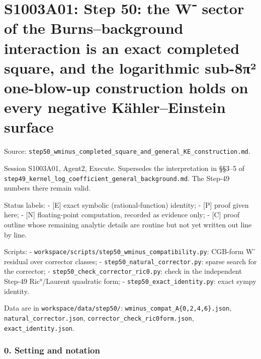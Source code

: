 \documentclass[
  10pt,
]{report}
\begin{document}
\hypertarget{s1003a01-step-50-the-w-sector-of-the-burnsbackground-interaction-is-an-exact-completed-square-and-the-logarithmic-sub-8ux3c0uxb2-one-blow-up-construction-holds-on-every-negative-kuxe4hlereinstein-surface}{%
\chapter{S1003A01: Step 50: the W⁻ sector of the Burns--background
interaction is an exact completed square, and the logarithmic sub-8π²
one-blow-up construction holds on every negative Kähler--Einstein
surface}\label{s1003a01-step-50-the-w-sector-of-the-burnsbackground-interaction-is-an-exact-completed-square-and-the-logarithmic-sub-8ux3c0uxb2-one-blow-up-construction-holds-on-every-negative-kuxe4hlereinstein-surface}}

Source:
\texttt{step50\_wminus\_completed\_square\_and\_general\_KE\_construction.md}.

Session S1003A01, Agent2, Execute. Supersedes the interpretation in
§§3--5 of
\texttt{step49\_kernel\_log\_coefficient\_general\_background.md}. The
Step-49 numbers there remain valid.

Status labels: - {[}E{]} exact symbolic (rational-function) identity; -
{[}P{]} proof given here; - {[}N{]} floating-point computation, recorded
as evidence only; - {[}C{]} proof outline whose remaining analytic
details are routine but not yet written out line by line.

Scripts: - \texttt{workspace/scripts/step50\_wminus\_compatibility.py}:
CGB-form W⁻ residual over corrector classes; -
\texttt{step50\_natural\_corrector.py}: sparse search for the corrector;
- \texttt{step50\_check\_corrector\_ric0.py}: check in the independent
Step-49 Ric°/Laurent quadratic form; -
\texttt{step50\_exact\_identity.py}: exact sympy identity.

Data are in \texttt{workspace/data/step50/}:
\texttt{wminus\_compat\_A\{0,2,4,6\}.json},
\texttt{natural\_corrector.json},
\texttt{corrector\_check\_ric0form.json}, \texttt{exact\_identity.json}.

\hypertarget{setting-and-notation}{%
\subsection{0. Setting and notation}\label{setting-and-notation}}
\end{document}
